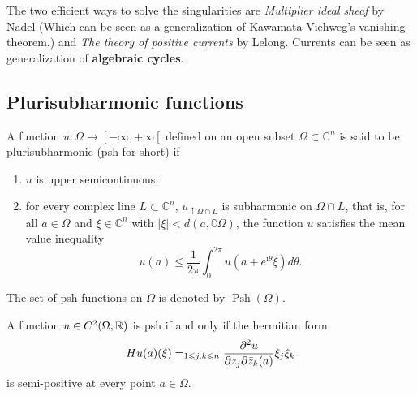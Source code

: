 The two efficient ways to solve the singularities are \emph{Multiplier ideal sheaf} by Nadel (Which can be seen as a generalization of Kawamata-Viehweg's vanishing theorem.) and \emph{The theory of positive currents} by Lelong. Currents can be seen as generalization of \textbf{algebraic cycles}.

\subsection{Plurisubharmonic functions}
\begin{definition}\label{def:psh functions}
    A function $u: \Omega \longrightarrow\left[-\infty,+\infty\left[\right.\right.$ defined on an open subset $\Omega \subset \mathbb{C}^n$ is said to be plurisubharmonic (psh for short) if
    \begin{enumerate}[label=(\alph*)]
        \item $u$ is upper semicontinuous;
        \item for every complex line $L \subset \mathbb{C}^n$, $u_{\uparrow \Omega \cap L}$ is subharmonic on $\Omega \cap L$, that is, for all $a \in \Omega$ and $\xi \in \mathbb{C}^n$ with $|\xi|<d(a, \complement \Omega)$, the function $u$ satisfies the mean value inequality
$$
u(a) \leqslant \frac{1}{2 \pi} \int_0^{2 \pi} u\left(a+e^{\mathrm{i} \theta} \xi\right) d \theta.
$$
    \end{enumerate}
The set of psh functions on $\Omega$ is denoted by $\operatorname{Psh}(\Omega)$.
\end{definition}

\begin{theorem}[]\label{thm:psh-criterion}
    A function $u\in C^2(\Omega,{\mathbb R})$ is psh if and only if the hermitian form
    \begin{equation*}
        Hu(a)(\xi)=\relax_{1\leqslant j,k\leqslant n}\frac{\partial^2 u}{\partial z_j\partial\bar z_k(a)} \xi_j\bar\xi_k
    \end{equation*}
    is semi-positive at every point $a\in \Omega$.
\end{theorem}

